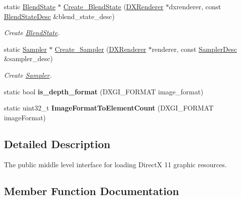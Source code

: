 \begin{DoxyCompactItemize}
static \hyperlink{classBlendState}{Blend\+State} $\ast$ \hyperlink{classDXResourceLoader_a9dffe29c8089cefc88b40f4972d13869}{Create\+\_\+\+Blend\+State} (\hyperlink{classDXRenderer}{D\+X\+Renderer} $\ast$dxrenderer, const \hyperlink{structBlendStateDesc}{Blend\+State\+Desc} \&blend\+\_\+state\+\_\+desc)
\begin{DoxyCompactList}\small\item\em Create \hyperlink{classBlendState}{Blend\+State}. \end{DoxyCompactList}\item 
static \hyperlink{classSampler}{Sampler} $\ast$ \hyperlink{classDXResourceLoader_aa1dac912b27e610a2c6a453c541bac02}{Create\+\_\+\+Sampler} (\hyperlink{classDXRenderer}{D\+X\+Renderer} $\ast$renderer, const \hyperlink{structSamplerDesc}{Sampler\+Desc} \&sampler\+\_\+desc)
\begin{DoxyCompactList}\small\item\em Create \hyperlink{classSampler}{Sampler}. \end{DoxyCompactList}\item 
\mbox{\label{classDXResourceLoader_ae28fea88e1f6f96d526b58219d5de6ac}} 
static bool {\bfseries is\+\_\+depth\+\_\+format} (D\+X\+G\+I\+\_\+\+F\+O\+R\+M\+AT image\+\_\+format)
\item 
\mbox{\label{classDXResourceLoader_aba7dbf81d5e8a3bf81406465c10f8bd6}} 
static uint32\+\_\+t {\bfseries Image\+Format\+To\+Element\+Count} (D\+X\+G\+I\+\_\+\+F\+O\+R\+M\+AT image\+Format)
\end{DoxyCompactItemize}


\subsection{Detailed Description}
The public middle level interface for loading DirectX 11 graphic resources. 

\subsection{Member Function Documentation}
\mbox{\label{classDXResourceLoader_a9dffe29c8089cefc88b40f4972d13869}} 
